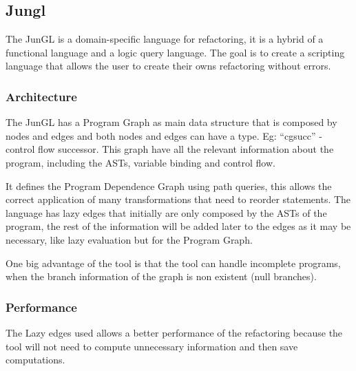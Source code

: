 \subsection{Jungl}
The JunGL \cite{verbaere2006jungl} is a domain-specific language for refactoring, it is a hybrid of a functional language and a logic query language. The goal is to create a scripting language that allows the user to create their owns refactoring without errors.

\subsubsection{Architecture}
The JunGL has a Program Graph as main data structure that is composed by nodes and edges and both nodes and edges can have a type. Eg: “cgsucc” - control flow successor. This graph have all the relevant information about the program, including the ASTs, variable binding and control flow.

It defines the Program Dependence Graph using path queries, this allows the correct application of many transformations that need to reorder statements.
The language has lazy edges that initially are only composed by the ASTs of the program, the rest of the information will be added later to the edges as it may be necessary, like lazy evaluation but for the Program Graph.

One big advantage of the tool is that the tool can handle incomplete programs, when the branch information of the graph is non existent (null branches).

\subsubsection{Performance}


The Lazy edges used allows a better performance of the refactoring because the tool will not need to compute unnecessary information and then save computations.


